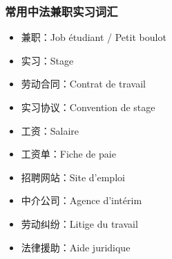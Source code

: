 \subsubsection{常用中法兼职实习词汇}
\begin{itemize}
    \item 兼职：Job étudiant / Petit boulot
    \item 实习：Stage
    \item 劳动合同：Contrat de travail
    \item 实习协议：Convention de stage
    \item 工资：Salaire
    \item 工资单：Fiche de paie
    \item 招聘网站：Site d’emploi
    \item 中介公司：Agence d’intérim
    \item 劳动纠纷：Litige du travail
    \item 法律援助：Aide juridique
\end{itemize}
